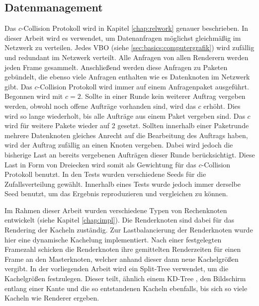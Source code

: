 \subsection{Datenmanagement}
\label{sec:basics:daten}
Das $c$-Collision Protokoll wird in Kapitel \ref{chap:relwork} genauer beschrieben. In dieser Arbeit wird es verwendet, um Datenanfragen möglichst gleichmäßig im Netzwerk zu verteilen. Jedes VBO (siehe \ref{sec:basics:computergrafik}) wird zufällig und redundant im Netzwerk verteilt. Alle Anfragen von allen Renderern werden jeden Frame gesammelt. Anschließend werden diese Anfragen zu Paketen gebündelt, die ebenso viele Anfragen enthalten wie es Datenknoten im Netzwerk gibt. Das $c$-Collision Protokoll wird immer auf einem Anfragenpaket ausgeführt. Begonnen wird mit $c = 2$. Sollte in einer Runde kein weiterer Auftrag vergeben werden, obwohl noch offene Aufträge vorhanden sind, wird das $c$ erhöht. Dies wird so lange wiederholt, bis alle Aufträge aus einem Paket vergeben sind. Das $c$ wird für weitere Pakete wieder auf 2 gesetzt. Sollten innerhalb einer Paketrunde mehrere Datenknoten gleiches Anrecht auf die Bearbeitung des Auftrags haben, wird der Auftrag zufällig an einen Knoten vergeben. Dabei wird jedoch die bisherige Last an bereits vergebenen Aufträgen dieser Runde berücksichtigt. Diese Last in Form von Dreiecken wird somit als Gewichtung für das $c$-Collision Protokoll benutzt. In den Tests wurden verschiedene Seeds für die Zufallsverteilung gewählt. Innerhalb eines Tests wurde jedoch immer derselbe Seed benutzt, um das Ergebnis reproduzieren und vergleichen zu können.

Im Rahmen dieser Arbeit wurden verschiedene Typen von Rechenknoten entwickelt (siehe Kapitel \ref{chap:impl}). Die Renderknoten sind dabei für das Rendering der Kacheln zuständig. Zur Lastbalancierung der Renderknoten wurde hier eine dynamische Kachelung implementiert. Nach einer festgelegten Framezahl schicken die Renderknoten ihre gemittelten Renderzeiten für einen Frame an den Masterknoten, welcher anhand dieser dann neue Kachelgrößen vergibt. In der vorliegenden Arbeit wird ein Split-Tree verwendet, um die Kachelgrößen festzulegen. Dieser teilt, ähnlich einem KD-Tree \cite{RTR3}, den Bildschirm entlang einer Kante und die so entstandenen Kacheln ebenfalls, bis sich so viele Kacheln wie Renderer ergeben. 

